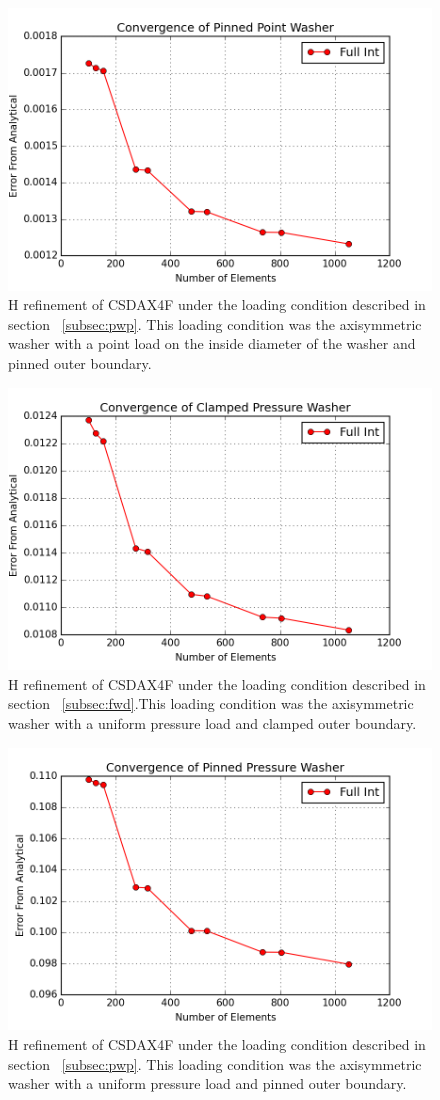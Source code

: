 \documentclass[10pt,letterpaper]{report}
\numberwithin{equation}{chapter}
\begin{document}
\begin{figure}[H]
\centering
\includegraphics[width=0.7\linewidth]{./GoodImages/Conv_WaPoPi_2}
\caption[H refinement of CSDAX4F]{H refinement of CSDAX4F under the loading condition described in section ~\ref{subsec:pwp}. This loading condition was the axisymmetric washer with a point load on the inside diameter of the washer and pinned outer boundary.}
\label{fig:Conv_PlPoCl_2}
\end{figure}

\begin{figure}[H]
\centering
\includegraphics[width=0.7\linewidth]{./GoodImages/Conv_WaPrCl_2}
\caption[H refinement of CSDAX4F]{H refinement of CSDAX4F under the loading condition described in section ~\ref{subsec:fwd}.This loading condition was the axisymmetric washer with a uniform pressure load and clamped outer boundary.}
\label{fig:Conv_PlPoCl_2}
\end{figure}

\begin{figure}[H]
\centering
\includegraphics[width=0.7\linewidth]{./GoodImages/Conv_WaPrPi_2}
\caption[H refinement of CSDAX4F]{H refinement of CSDAX4F under the loading condition described in section ~\ref{subsec:pwp}. This loading condition was the axisymmetric washer with a uniform pressure load and pinned outer boundary.}
\label{fig:Conv_PlPoCl_2}
\end{figure}
\end{document}
